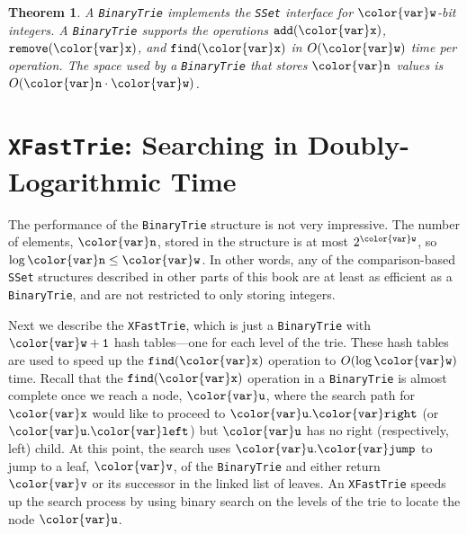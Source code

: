 \documentclass[10pt]{book}
\newcommand{\seclabel}[1]{\label{sec:#1}}
\theoremstyle{plain}
\newtheorem{thm}{Theorem}[chapter]
\theoremstyle{definition}
\begin{document}
\begin{thm}
A \texttt{BinaryTrie} implements the \texttt{SSet} interface for \ensuremath{\mathtt{{\color{var}w}}}-bit integers. A
\texttt{BinaryTrie} supports the operations \ensuremath{\mathtt{add({\color{var}x})}}, \ensuremath{\mathtt{remove({\color{var}x})}}, and \ensuremath{\mathtt{find({\color{var}x})}}
in $O(\ensuremath{\mathtt{{\color{var}w}}})$ time per operation.  The space used by a \texttt{BinaryTrie} that
stores \ensuremath{\mathtt{{\color{var}n}}} values is $O(\ensuremath{\mathtt{{\color{var}n}}}\cdot\ensuremath{\mathtt{{\color{var}w}}})$.
\end{thm}

\section{\texttt{XFastTrie}: Searching in Doubly-Logarithmic Time}
\seclabel{xfast}

%
The performance of the \texttt{BinaryTrie} structure is not very impressive.
The number of elements, \ensuremath{\mathtt{{\color{var}n}}}, stored in the structure is at most $2^{\ensuremath{\mathtt{{\color{var}w}}}}$,
so $\log \ensuremath{\mathtt{{\color{var}n}}}\le \ensuremath{\mathtt{{\color{var}w}}}$.  In other words, any of the comparison-based \texttt{SSet}
structures described in other parts of this book are at least as efficient
as a \texttt{BinaryTrie}, and are not restricted to only storing integers.

Next we describe the \texttt{XFastTrie}, which is just a \texttt{BinaryTrie} with
\ensuremath{\mathtt{{\color{var}w}+1}} hash tables---one for each level of the trie. These hash tables
are used to speed up the \ensuremath{\mathtt{find({\color{var}x})}} operation to $O(\log \ensuremath{\mathtt{{\color{var}w}}})$ time.
Recall that the \ensuremath{\mathtt{find({\color{var}x})}} operation in a \texttt{BinaryTrie} is almost complete
once we reach a node, \ensuremath{\mathtt{{\color{var}u}}}, where the search path for \ensuremath{\mathtt{{\color{var}x}}} would like to
proceed to \ensuremath{\mathtt{{\color{var}u}.{\color{var}right}}} (or \ensuremath{\mathtt{{\color{var}u}.{\color{var}left}}}) but \ensuremath{\mathtt{{\color{var}u}}} has no right (respectively,
left) child.  At this point, the search uses \ensuremath{\mathtt{{\color{var}u}.{\color{var}jump}}} to jump to a leaf,
\ensuremath{\mathtt{{\color{var}v}}}, of the \texttt{BinaryTrie} and either return \ensuremath{\mathtt{{\color{var}v}}} or its successor in the
linked list of leaves.  An \texttt{XFastTrie} speeds up the search process by
using binary search
%
on the levels of the trie to locate the node \ensuremath{\mathtt{{\color{var}u}}}.
\end{document}
